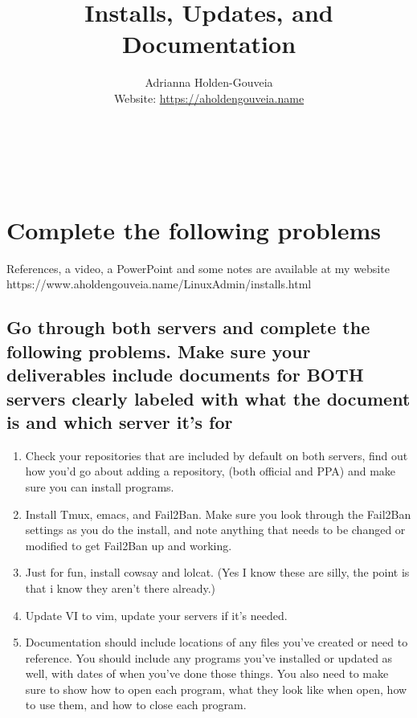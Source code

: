 \documentclass[12pt]{article}
\title{Installs, Updates, and Documentation}
\author{
        Adrianna Holden-Gouveia \\
        Website: \url{https://aholdengouveia.name}\\ 
        \date{\vspace{-5ex}}
        \faLinkedin{: aholdengouveia} \\
        \faGithub {: aholdengouveia} \\
        \faTwitter {: aholdengouveia} \\
        }
\begin{document}
    

\maketitle


\section*{Complete the following problems}

References, a video, a PowerPoint and some notes are available at my website
https://www.aholdengouveia.name/LinuxAdmin/installs.html



\subsection*{Go through both servers and complete the following problems.  Make sure your deliverables include documents for BOTH servers clearly labeled with what the document is and which server it's for}
    \begin{enumerate}
        \item Check your repositories that are included by default on both servers, find out how you'd go about adding a repository, (both official and PPA) and make sure you can install programs.
        \item Install Tmux, emacs, and Fail2Ban.  Make sure you look through the Fail2Ban settings as you do the install, and note anything that needs to be changed or modified to get Fail2Ban up and working.
        \item Just for fun, install cowsay and lolcat.   (Yes I know these are silly, the point is that i know they aren't there already.)
        \item Update VI to vim, update your servers if it's needed.
        \item Documentation should include locations of any files you've created or need to reference. You should include any programs you've installed or updated as well, with dates of when you've done those things. You also need to make sure to show how to open each program, what they look like when open, how to use them, and how to close each program.
    \end{enumerate}
\end{document}
